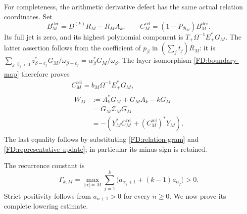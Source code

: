 For completeness, the arithmetic derivative defect has the same actual
relation coordinates.  Set
\[
B_M^{\mathrm{der}}=D^{(k)}R_M-R_MA_k,
\qquad C_M^{\mathrm{rel}}=(1-P_{\mathcal B_M})B_M^{\mathrm{der}}.
\]
Its full jet is zero, and its highest polynomial component is
\(T_+\Omega^{-1}E_+^*G_M\).  The latter assertion follows from the
coefficient of \(p_\beta\) in \((\sum_jt_j)R_M\): it is
\(\sum_{j:\beta_j>0}z_{\beta-e_j}^*G_M/\omega_{\beta-e_j}
=w_\beta^*G_M/\omega_\beta\).  The layer isomorphism
\eqref{FD:boundary-map} therefore proves
\begin{equation}
\begin{gathered}
C_M^{\mathrm{rel}}=b_M\Omega^{-1}E_+^*G_M,\\
\begin{aligned}
W_M&:=A_k^*G_M+G_MA_k-kG_M\\
&=G_M\mathcal Z_MG_M\\
&=-(Y_M^*C_M^{\mathrm{rel}}+(C_M^{\mathrm{rel}})^*Y_M).
\end{aligned}
\end{gathered}
\tag{FD.19}\label{FD:actual-control}
\end{equation}
The last equality follows by substituting
\eqref{FD:relation-gram} and \eqref{FD:representative-update}; in
particular its minus sign is retained.

The recurrence constant is
\begin{equation}
\Gamma_{k,M}=\max_{|\alpha|=M}\sum_{j=1}^k
\bigl(a_{\alpha_j+1}+(k-1)a_{\alpha_j}\bigr)>0.
\tag{FD.20}\label{FD:Gamma}
\end{equation}
Strict positivity follows from \(a_{n+1}>0\) for every \(n\ge0\).
We now prove its complete lowering estimate.

